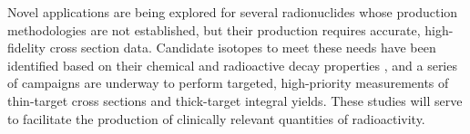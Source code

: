 Novel applications are being explored for several radionuclides whose production methodologies are not established, but their production requires accurate, high-fidelity cross section data.
Candidate isotopes to meet these needs 
have been identified based on their chemical and radioactive decay properties \cite{NSACIsotopesSubcommittee2015,Qaim201731,bernstein2015nuclear}, and a series of campaigns are underway to perform targeted, high-priority measurements of thin-target cross sections and thick-target integral yields.
These studies will serve to facilitate the production of clinically relevant quantities of radioactivity.

